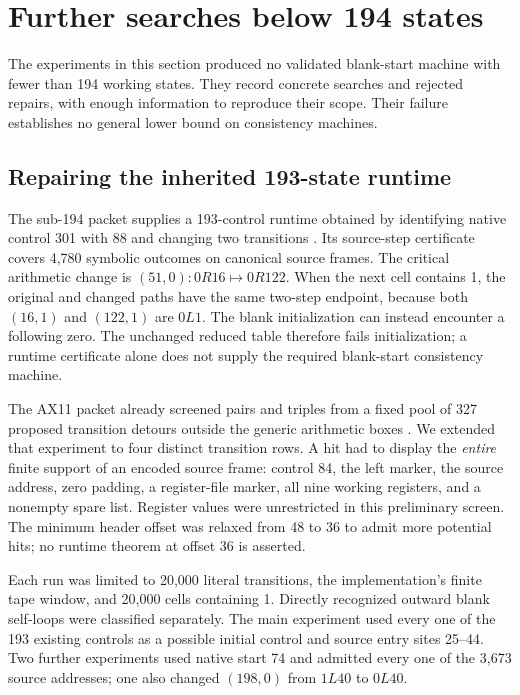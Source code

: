 \section{Further searches below 194 states}
\label{sec:additional-search}

The experiments in this section produced no validated blank-start machine
with fewer than 194 working states. They record concrete searches and rejected
repairs, with enough information to reproduce their scope. Their failure
establishes no general lower bound on consistency machines.

\subsection{Repairing the inherited 193-state runtime}

The sub-194 packet supplies a 193-control runtime obtained by identifying
native control 301 with 88 and changing two transitions
\cite{sub194packet}. Its source-step certificate covers 4,780 symbolic
outcomes on canonical source frames. The critical arithmetic change is
\((51,0):0R16\mapsto0R122\). When the next cell contains 1, the original
and changed paths have the same two-step endpoint, because both
\((16,1)\) and \((122,1)\) are \(0L1\). The blank initialization can instead
encounter a following zero. The unchanged reduced table therefore fails
initialization; a runtime certificate alone does not supply the required
blank-start consistency machine.

The AX11 packet already screened pairs and triples from a fixed pool of
327 proposed transition detours outside the generic arithmetic boxes
\cite{ax11packet}. We extended that experiment to four distinct transition
rows. A hit had to display the \emph{entire} finite support of an encoded
source frame: control 84, the left marker, the source address, zero padding,
a register-file marker, all nine working registers, and a nonempty spare
list. Register values were unrestricted in this preliminary screen.
The minimum header offset was relaxed from 48 to 36 to admit more potential
hits; no runtime theorem at offset 36 is asserted.

Each run was limited to 20,000 literal transitions, the implementation's
finite tape window, and 20,000 cells containing 1. Directly recognized
outward blank self-loops were classified separately. The main experiment
used every one of the 193 existing controls as a possible initial control
and source entry sites 25--44. Two further experiments used native start
74 and admitted every one of the 3,673 source addresses; one also changed
\((198,0)\) from \(1L40\) to \(0L40\).

